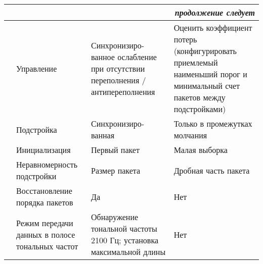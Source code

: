 \begin{longtable}{|p{3cm}||p{4cm}|p{4cm}|p{3.5cm}|}
                                              \endhead        
 \multicolumn{4}{|r|}{\small\slshape продолжение следует}  \\ \hline
                                              \endfoot        \hline
                                              \endlastfoot
\multirow{6}{*}{Адаптивный}    & Управление                                                          & Синхронизиро- ванное ослабление при отсутствии переполнения / антипереполнения & Оценить коэффициент потерь (конфигурировать приемлемый наименьший порог и минимальный счет пакетов между подстройками) \\ 
\cline{2-4}
                               & Подстройка                                                          & Синхронизиро- ванная                                                           & Только в промежутках молчания                                                                                          \\
\cline{2-4}
                               & Инициализация                                                       & Первый пакет                                                                 & Малая выборка                                                                                                          \\ 
\cline{2-4}
                               & Неравномерность подстройки                                          & Размер пакета                                                                & Дробная часть пакета                                                                                                   \\ 
\cline{2-4}
                               & Восстановление порядка пакетов                                      & Да                                                                           & Нет                                                                                                                    \\ 
\cline{2-4}
                               & Режим передачи данных в полосе тональных частот                     & Обнаружение тональной частоты 2100 Гц; установка максимальной длины          & Нет                                                                                                                    \\ 
\hline
    \end{longtable}







